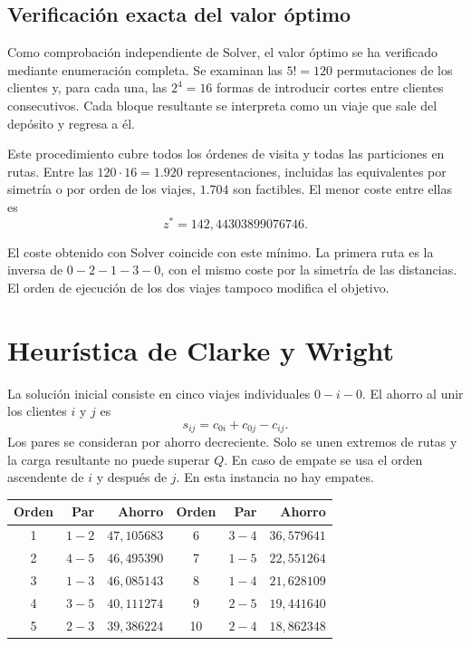 \documentclass[10pt,a4paper]{article}
\begin{document}
\subsection{Verificación exacta del valor óptimo}

Como comprobación independiente de Solver, el valor óptimo se ha verificado
mediante enumeración completa. Se examinan
las $5!=120$ permutaciones de los clientes y, para cada una, las $2^4=16$
formas de introducir cortes entre clientes consecutivos. Cada bloque
resultante se interpreta como un viaje que sale del depósito y regresa a él.

Este procedimiento cubre todos los órdenes de visita y todas las particiones
en rutas. Entre las $120\cdot16=1.920$ representaciones, incluidas las
equivalentes por simetría o por orden de los viajes, $1.704$ son factibles.
El menor coste entre ellas es
\[
  \boxed{z^*=142{,}44303899076746}.
\]

El coste obtenido con Solver coincide con este mínimo. La primera ruta es
la inversa de $0-2-1-3-0$, con el mismo coste por la simetría de las distancias.
El orden de ejecución de los dos viajes tampoco modifica el objetivo.

\newpage
\section{Heurística de Clarke y Wright}

La solución inicial consiste en cinco viajes individuales $0-i-0$.
El ahorro al unir los clientes $i$ y $j$ es
\[
 s_{ij}=c_{0i}+c_{0j}-c_{ij}.
\]
Los pares se consideran por ahorro decreciente. Solo se unen extremos de
rutas y la carga resultante no puede superar $Q$. En caso de empate se usa
el orden ascendente de $i$ y después de $j$. En esta instancia no hay empates.

\begin{center}
\begin{tabular}{crr@{\qquad}crr}
\toprule
Orden & Par & Ahorro & Orden & Par & Ahorro\\
\midrule
1 & $1-2$ & $47{,}105683$ & 6  & $3-4$ & $36{,}579641$\\
2 & $4-5$ & $46{,}495390$ & 7  & $1-5$ & $22{,}551264$\\
3 & $1-3$ & $46{,}085143$ & 8  & $1-4$ & $21{,}628109$\\
4 & $3-5$ & $40{,}111274$ & 9  & $2-5$ & $19{,}441640$\\
5 & $2-3$ & $39{,}386224$ & 10 & $2-4$ & $18{,}862348$\\
\bottomrule
\end{tabular}
\end{center}
\end{document}
